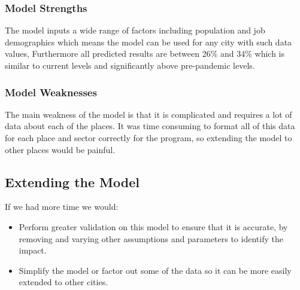     
            \subsubsection{Model Strengths}
                The model inputs a wide range of factors including population and job demographics which means the model can be used for any city with such data values, Furthermore all predicted results are between 26\% and 34\% which is similar to current levels and significantly above pre-pandemic levels.
            \subsubsection{Model Weaknesses}
                The main weakness of the model is that it is complicated and requires a lot of data about each of the places. It was time consuming to format all of this data for each place and sector correctly for the program, so extending the model to other places would be painful.
            
        \subsection{Extending the Model}
            
            If we had more time we would:
            \begin{itemize}
                \item Perform greater validation on this model to ensure that it is accurate, by removing and varying other assumptions and parameters to identify the impact.
                \item Simplify the model or factor out some of the data so it can be more easily extended to other cities.
            \end{itemize}
        
        